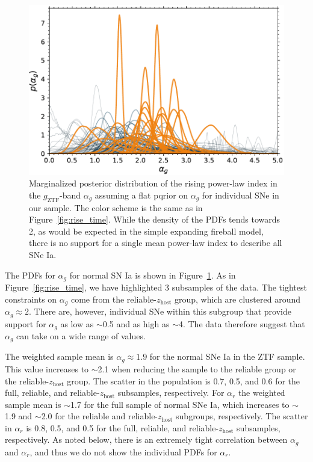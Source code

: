\documentclass[twocolumn]{./aastex63}
\newcommand{\gztf}{$g_\mathrm{ZTF}$}
\begin{document}
\begin{figure}
    \centering
    \includegraphics[width=1\linewidth]{./figures/alpha_g.pdf}
    \caption{Marginalized posterior distribution of the rising power-law
    index in the \gztf-band $\alpha_g$ assuming a flat pqrior on $\alpha_g$
    for individual SNe in our sample. The color scheme is the same as in
    Figure~\ref{fig:rise_time}. While the
    density of the PDFs tends towards 2, as would be expected in the simple
    expanding fireball model, there is no support for a single mean power-law
    index to describe all SNe Ia.}
    \label{fig:alpha_rise}
\end{figure}

The PDFs for $\alpha_g$ for normal SN Ia is shown in
Figure~\ref{fig:alpha_rise}. As in Figure~\ref{fig:rise_time}, we have
highlighted 3 subsamples of the data. The tightest constraints on $\alpha_g$
come from the reliable-$z_\mathrm{host}$ group, which are clustered around
$\alpha_g \approx 2$. There are, however, individual SNe within this subgroup
that provide support for $\alpha_g$ as low as $\sim$0.5 and as high as
$\sim$4. The data therefore suggest that $\alpha_g$ can take on a wide range
of values.

The weighted sample mean is $\alpha_g \approx 1.9$ for the normal SNe Ia in
the ZTF sample. This value increases to $\sim$2.1 when reducing the sample to
the reliable group or the reliable-$z_\mathrm{host}$ group. The scatter in the
population is 0.7, 0.5, and 0.6 for the full, reliable, and
reliable-$z_\mathrm{host}$ subsamples, respectively. For $\alpha_r$ the
weighted sample mean is $\sim$1.7 for the full sample of normal SNe Ia, which
increases to $\sim$1.9 and $\sim$2.0 for the reliable and
reliable-$z_\mathrm{host}$ subgroups, respectively. The scatter in $\alpha_r$
is 0.8, 0.5, and 0.5 for the full, reliable, and reliable-$z_\mathrm{host}$
subsamples, respectively. As noted below, there is an extremely tight
correlation between $\alpha_g$ and $\alpha_r$, and thus we do not show the
individual PDFs for $\alpha_r$.
\end{document}
